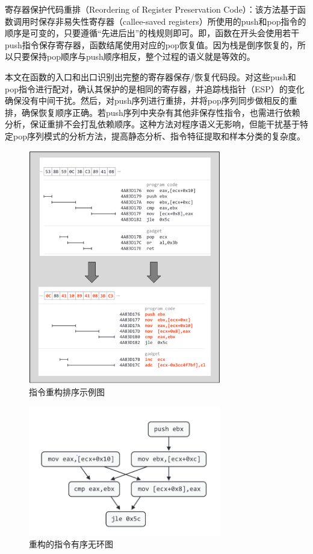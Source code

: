 寄存器保护代码重排（Reordering of Register Preservation Code）：该方法基于函数调用时保存非易失性寄存器（callee-saved registers）所使用的push和pop指令的顺序是可变的，只要遵循“先进后出”的栈规则即可。即，函数在开头会使用若干push指令保存寄存器，函数结尾使用对应的pop恢复值。因为栈是倒序恢复的，所以只要保持pop顺序与push顺序相反，整个过程的语义就是等效的。

本文在函数的入口和出口识别出完整的寄存器保存/恢复代码段。对这些push和pop指令进行配对，确认其保护的是相同的寄存器，并追踪栈指针（ESP）的变化确保没有中间干扰。然后，对push序列进行重排，并将pop序列同步做相反的重排，确保恢复顺序正确。若push序列中夹杂有其他非保存性指令，也需进行依赖分析，保证重排不会打乱依赖顺序。这种方法对程序语义无影响，但能干扰基于特定pop序列模式的分析方法，提高静态分析、指令特征提取和样本分类的复杂度。

\begin{figure}[hbt]
	\centering
	\includegraphics[width=0.75\textwidth]{figures/4.3}
	\caption{指令重构排序示例图}\label{fig:4.3}
\end{figure}

\begin{figure}[hbt]
	\centering
	\includegraphics[width=0.75\textwidth]{figures/4.4}
	\caption{重构的指令有序无环图}\label{fig:4.4}
\end{figure}

